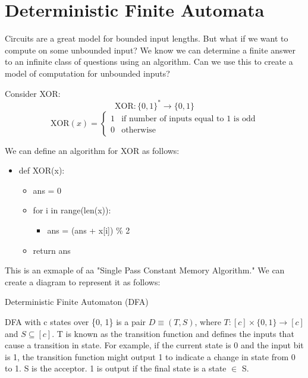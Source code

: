 \chapter{Deterministic Finite Automata}

Circuits are a great model for bounded input lengths. But what if we want to compute on some unbounded input? We know we can determine a finite answer to an infinite class of questions using an algorithm. Can we use this to create a model of computation for unbounded inputs?

Consider XOR:
\[
    \text{XOR}: \{0,1\}^* \rightarrow \{0,1\}
\]
\begin{equation}
    \text{XOR}(x) = 
    \begin{cases}
        1 & \text{if number of inputs equal to 1 is odd} \\
        0 & \text{otherwise}
    \end{cases}
\end{equation}

We can define an algorithm for XOR as follows:
\begin{itemize}
    \item def XOR(x):
    \begin{itemize}
        \item ans = 0
        \item for i in range(len(x)):
        \begin{itemize}
            \item ans = (ans + x[i]) \% 2
        \end{itemize}
        \item return ans
    \end{itemize}
\end{itemize}

This is an exmaple of aa "Single Pass Constant Memory Algorithm." We can create a diagram to represent it as follows:
\begin{center}
\end{center}

\begin{definition}
    Deterministic Finite Automaton (DFA)

    DFA with c states over \{0, 1\} is a pair $D \equiv (T, S)$, where $T: [c] \times \{0, 1\} \rightarrow [c]$ and $S \subseteq [c]$. T is known as the transition function and defines the inputs that cause a transition in state. For example, if the current state is 0 and the input bit is 1, the transition function might output 1 to indicate a change in state from 0 to 1. S is the acceptor. 1 is output if the final state is a state $\in$ S.
\end{definition}